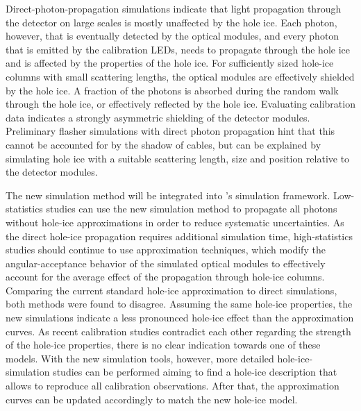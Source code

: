 Direct-photon-propagation simulations indicate that light propagation
through the \icecube detector on large scales is mostly unaffected by
the hole ice. Each photon, however, that is eventually detected by the
optical modules, and every photon that is emitted by the calibration
LEDs, needs to propagate through the hole ice and is affected by the
properties of the hole ice. For sufficiently sized hole-ice columns with
small scattering lengths, the optical modules are effectively shielded
by the hole ice. A fraction of the photons is absorbed during the random
walk through the hole ice, or effectively reflected by the hole ice.
Evaluating calibration data indicates a strongly asymmetric shielding of
the detector modules. Preliminary flasher simulations with direct photon
propagation hint that this cannot be accounted for by the shadow of
cables, but can be explained by simulating hole ice with a suitable
scattering length, size and position relative to the detector modules.

The new simulation method will be integrated into \icecube's simulation
framework. Low-statistics studies can use the new simulation method to
propagate all photons without hole-ice approximations in order to reduce
systematic uncertainties. As the direct hole-ice propagation requires
additional simulation time, high-statistics studies should continue to
use approximation techniques, which modify the angular-acceptance
behavior of the simulated optical modules to effectively account for the
average effect of the propagation through hole-ice columns. Comparing
the current standard hole-ice approximation to direct simulations, both
methods were found to disagree. Assuming the same hole-ice properties,
the new simulations indicate a less pronounced hole-ice effect than the
approximation curves. As recent calibration studies contradict each
other regarding the strength of the hole-ice properties, there is no
clear indication towards one of these models. With the new simulation
tools, however, more detailed hole-ice-simulation studies can be
performed aiming to find a hole-ice description that allows to reproduce
all calibration observations. After that, the approximation curves can
be updated accordingly to match the new hole-ice model.
